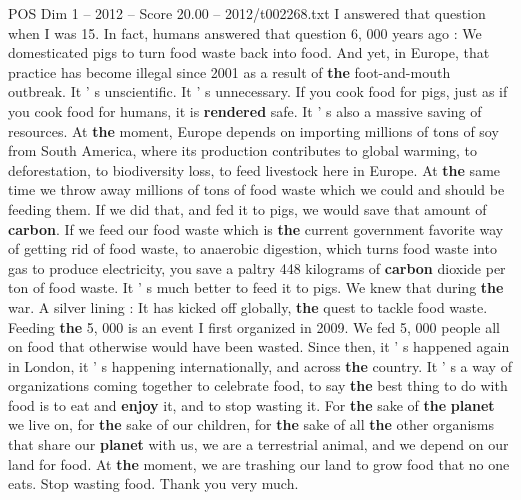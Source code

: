\begin{textsample}{POS Dim 1 – 2012 – Score 20.00 – 2012/t002268.txt}
I answered that question when I was 15.
In fact, humans answered that question 6, 000 years ago : We domesticated pigs to turn food waste back into food.
And yet, in Europe, that practice has become illegal since 2001 as a result of \textbf{the} foot-and-mouth outbreak.
It ' s unscientific.
It ' s unnecessary.
If you cook food for pigs, just as if you cook food for humans, it is \textbf{rendered} safe.
It ' s also a massive saving of resources.
At \textbf{the} moment, Europe depends on importing millions of tons of soy from South America, where its production contributes to global warming, to deforestation, to biodiversity loss, to feed livestock here in Europe.
At \textbf{the} same time we throw away millions of tons of food waste which we could and should be feeding them.
If we did that, and fed it to pigs, we would save that amount of \textbf{carbon}.
If we feed our food waste which is \textbf{the} current government favorite way of getting rid of food waste, to anaerobic digestion, which turns food waste into gas to produce electricity, you save a paltry 448 kilograms of \textbf{carbon} dioxide per ton of food waste.
It ' s much better to feed it to pigs.
We knew that during \textbf{the} war.
A silver lining : It has kicked off globally, \textbf{the} quest to tackle food waste.
Feeding \textbf{the} 5, 000 is an event I first organized in 2009.
We fed 5, 000 people all on food that otherwise would have been wasted.
Since then, it ' s happened again in London, it ' s happening internationally, and across \textbf{the} country.
It ' s a way of organizations coming together to celebrate food, to say \textbf{the} best thing to do with food is to eat and \textbf{enjoy} it, and to stop wasting it.
For \textbf{the} sake of \textbf{the} \textbf{planet} we live on, for \textbf{the} sake of our children, for \textbf{the} sake of all \textbf{the} other organisms that share our \textbf{planet} with us, we are a terrestrial animal, and we depend on our land for food.
At \textbf{the} moment, we are trashing our land to grow food that no one eats.
Stop wasting food.
Thank you very much.

\end{textsample}
